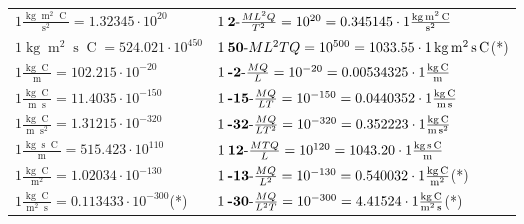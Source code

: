 \begin{center}
\begin{longtable}{l l}
{\color{black}$1 \bm{\mathrm{ }}\frac{\operatorname{kg}\operatorname{m}^2\operatorname{C}}{\operatorname{s}^2} = 1.32345\cdot10^{20} $}&
	{\color{black}$1\:\text{\textbf{2}-} \frac{ML^2Q}{T^2}=10^{20} = 0.345145 \cdot 1 \bm{\mathrm{ }}\frac{\operatorname{kg}\operatorname{m}^2\operatorname{C}}{\operatorname{s}^2}$}\\
{\color{black}$1 \bm{\mathrm{ }}\operatorname{kg}\operatorname{m}^2\operatorname{s}\operatorname{C} = 524.021\cdot10^{450} $}&
	{\color{black}$1\:\text{\textbf{50}-} ML^2TQ=10^{500} = 1033.55 \cdot 1 \bm{\mathrm{ }}\operatorname{kg}\operatorname{m}^2\operatorname{s}\operatorname{C}$}\quad(*)\\
{\color{black}$1 \bm{\mathrm{ }}\frac{\operatorname{kg}\operatorname{C}}{\operatorname{m}} = 102.215\cdot10^{-20} $}&
	{\color{black}$1\:\text{\textbf{-2}-} \frac{MQ}{L}=10^{-20} = 0.00534325 \cdot 1 \bm{\mathrm{ }}\frac{\operatorname{kg}\operatorname{C}}{\operatorname{m}}$}\\
{\color{black}$1 \bm{\mathrm{ }}\frac{\operatorname{kg}\operatorname{C}}{\operatorname{m}\operatorname{s}} = 11.4035\cdot10^{-150} $}&
	{\color{black}$1\:\text{\textbf{-15}-} \frac{MQ}{LT}=10^{-150} = 0.0440352 \cdot 1 \bm{\mathrm{ }}\frac{\operatorname{kg}\operatorname{C}}{\operatorname{m}\operatorname{s}}$}\\
{\color{black}$1 \bm{\mathrm{ }}\frac{\operatorname{kg}\operatorname{C}}{\operatorname{m}\operatorname{s}^2} = 1.31215\cdot10^{-320} $}&
	{\color{black}$1\:\text{\textbf{-32}-} \frac{MQ}{LT^2}=10^{-320} = 0.352223 \cdot 1 \bm{\mathrm{ }}\frac{\operatorname{kg}\operatorname{C}}{\operatorname{m}\operatorname{s}^2}$}\\
{\color{black}$1 \bm{\mathrm{ }}\frac{\operatorname{kg}\operatorname{s}\operatorname{C}}{\operatorname{m}} = 515.423\cdot10^{110} $}&
	{\color{black}$1\:\text{\textbf{12}-} \frac{MTQ}{L}=10^{120} = 1043.20 \cdot 1 \bm{\mathrm{ }}\frac{\operatorname{kg}\operatorname{s}\operatorname{C}}{\operatorname{m}}$}\\
{\color{black}$1 \bm{\mathrm{ }}\frac{\operatorname{kg}\operatorname{C}}{\operatorname{m}^2} = 1.02034\cdot10^{-130} $}&
	{\color{black}$1\:\text{\textbf{-13}-} \frac{MQ}{L^2}=10^{-130} = 0.540032 \cdot 1 \bm{\mathrm{ }}\frac{\operatorname{kg}\operatorname{C}}{\operatorname{m}^2}$}\quad(*)\\
{\color{black}$1 \bm{\mathrm{ }}\frac{\operatorname{kg}\operatorname{C}}{\operatorname{m}^2\operatorname{s}} = 0.113433\cdot10^{-300} $}\quad(*)&
	{\color{black}$1\:\text{\textbf{-30}-} \frac{MQ}{L^2T}=10^{-300} = 4.41524 \cdot 1 \bm{\mathrm{ }}\frac{\operatorname{kg}\operatorname{C}}{\operatorname{m}^2\operatorname{s}}$}\quad(*)\\

\end{longtable}
\end{center}
